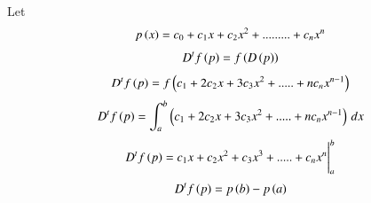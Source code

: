 Let 
\begin{align}
    p\left(x\right)=c_0+c_1x+c_2x^{2}+.........+c_n x^{n}
\end{align}
\begin{align}
    D^{t}f\left(p\right)=f\left(D\left(p\right)\right)
\end{align}
\begin{align}
    D^{t}f\left(p\right)=f\left(c_1+2c_2x+3c_3x^{2}+.....+n c_n x^{n-1}\right)
\end{align}
\begin{align}
    D^{t}f\left(p\right)=\int_{a}^{b}\left(c_1+2c_2x+3c_3x^{2}+.....+n c_n x^{n-1}\right)  \,dx
\end{align}
\begin{align}
    D^{t}f\left(p\right)=c_1x+c_2x^{2}+c_3x^{3}+.....+c_n x^{n}\Biggr|^b_a
\end{align}
\begin{align}
    D^{t}f\left(p\right)=p\left(b\right)-p\left(a\right)
\end{align}


